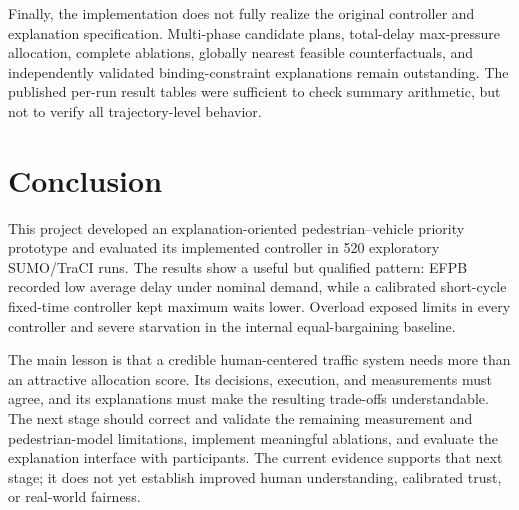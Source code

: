 \documentclass[sigconf]{acmart}
\begin{document}
Finally, the implementation does not fully realize the original
controller and explanation specification. Multi-phase candidate
plans, total-delay max-pressure allocation, complete ablations,
globally nearest feasible counterfactuals, and independently
validated binding-constraint explanations remain outstanding.
The published per-run result tables were sufficient to check
summary arithmetic, but not to verify all trajectory-level behavior.

\section{Conclusion}
This project developed an explanation-oriented pedestrian--vehicle
priority prototype and evaluated its implemented controller in
520 exploratory SUMO/TraCI runs. The results show a useful but
qualified pattern: EFPB recorded low average delay under nominal
demand, while a calibrated short-cycle fixed-time controller kept
maximum waits lower. Overload exposed limits in every controller
and severe starvation in the internal equal-bargaining baseline.

The main lesson is that a credible human-centered traffic system
needs more than an attractive allocation score. Its decisions,
execution, and measurements must agree, and its explanations must
make the resulting trade-offs understandable. The next stage
should correct and validate the remaining measurement and
pedestrian-model limitations, implement meaningful ablations,
and evaluate the explanation interface with participants. The
current evidence supports that next stage; it does not yet
establish improved human understanding, calibrated trust, or
real-world fairness.



\end{document}
